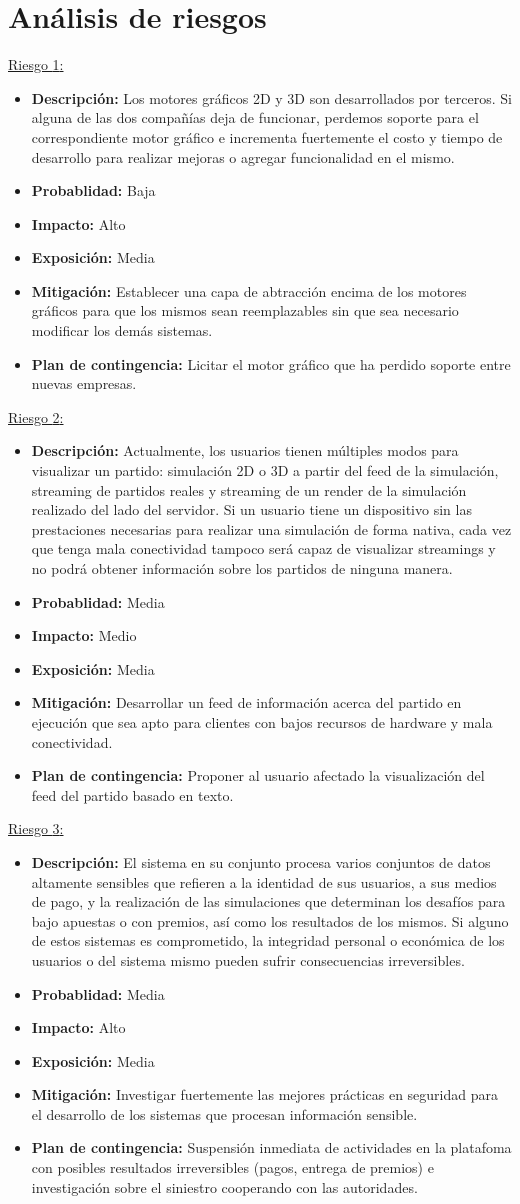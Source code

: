\documentclass[a4paper, 10pt, twoside]{article}
\newcommand{\riesgo}[7]{
  \underline{Riesgo {#1}:}
  \begin{itemize}   
    \item \textbf{Descripción:} {#2}
    \item \textbf{Probablidad:} {#3}
    \item \textbf{Impacto:} {#4}
    \item \textbf{Exposición:} {#5}
    \item \textbf{Mitigación:} {#6}
    \item \textbf{Plan de contingencia:} {#7}
  \end{itemize}
}
\begin{document}

\section{Análisis de riesgos}
\label{riesgos:r1}
\riesgo{1}
    { Los motores gráficos 2D y 3D son desarrollados por terceros. Si alguna de las dos compañías deja de funcionar, perdemos soporte para el correspondiente motor gráfico e incrementa fuertemente el costo y tiempo de desarrollo para realizar mejoras o agregar funcionalidad en el mismo. }
    {Baja} %
    {Alto} %
    {Media} %
    {Establecer una capa de abtracción encima de los motores gráficos para que los mismos sean reemplazables sin que sea necesario modificar los demás sistemas.} %
    {Licitar el motor gráfico que ha perdido soporte entre nuevas empresas.} %

\riesgo{2}
    {Actualmente, los usuarios tienen múltiples modos para visualizar un partido: simulación 2D o 3D a partir del feed de la simulación, streaming de partidos reales y streaming de un render de la simulación realizado del lado del servidor. Si un usuario tiene un dispositivo sin las prestaciones necesarias para realizar una simulación de forma nativa, cada vez que tenga mala conectividad tampoco será capaz de visualizar streamings y no podrá obtener información sobre los partidos de ninguna manera. }
    {Media} %
    {Medio} %
    {Media} %
    {Desarrollar un feed de información acerca del partido en ejecución que sea apto para clientes con bajos recursos de hardware y mala conectividad.}
    {Proponer al usuario afectado la visualización del feed del partido basado en texto.}

\riesgo{3}
    {El sistema en su conjunto procesa varios conjuntos de datos altamente sensibles que refieren a la identidad de sus usuarios, a sus medios de pago, y la realización de las simulaciones que determinan los desafíos para bajo apuestas o con premios, así como los resultados de los mismos. Si alguno de estos sistemas es comprometido, la integridad personal o económica de los usuarios o del sistema mismo pueden sufrir consecuencias irreversibles. }
    {Media} %
    {Alto} %
    {Media} %
    {Investigar fuertemente las mejores prácticas en seguridad para el desarrollo de los sistemas que procesan información sensible.}
    {Suspensión inmediata de actividades en la platafoma con posibles resultados irreversibles (pagos, entrega de premios) e investigación sobre el siniestro cooperando con las autoridades.}

\newpage




\end{document}
